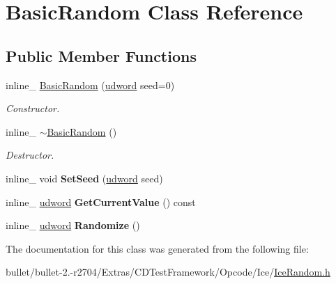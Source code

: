 \hypertarget{class_basic_random}{\section{Basic\+Random Class Reference}
\label{class_basic_random}
}
\subsection*{Public Member Functions}
\begin{DoxyCompactItemize}
\item 
\hypertarget{class_basic_random_aa0c310555289aaf7331447f9e98acd7f}{inline\+\_\+ \hyperlink{class_basic_random_aa0c310555289aaf7331447f9e98acd7f}{Basic\+Random} (\hyperlink{_ice_types_8h_a44c6f1920ba5551225fb534f9d1a1733}{udword} seed=0)}\label{class_basic_random_aa0c310555289aaf7331447f9e98acd7f}

\begin{DoxyCompactList}\small\item\em Constructor. \end{DoxyCompactList}\item 
\hypertarget{class_basic_random_a2990bcd02ae20f844d2fdf54069f8a45}{inline\+\_\+ \hyperlink{class_basic_random_a2990bcd02ae20f844d2fdf54069f8a45}{$\sim$\+Basic\+Random} ()}\label{class_basic_random_a2990bcd02ae20f844d2fdf54069f8a45}

\begin{DoxyCompactList}\small\item\em Destructor. \end{DoxyCompactList}\item 
\hypertarget{class_basic_random_ad6cc026eb6d290c918be4215e87710d7}{inline\+\_\+ void {\bfseries Set\+Seed} (\hyperlink{_ice_types_8h_a44c6f1920ba5551225fb534f9d1a1733}{udword} seed)}\label{class_basic_random_ad6cc026eb6d290c918be4215e87710d7}

\item 
\hypertarget{class_basic_random_a9092bbd85517a43a9a5351f888f97561}{inline\+\_\+ \hyperlink{_ice_types_8h_a44c6f1920ba5551225fb534f9d1a1733}{udword} {\bfseries Get\+Current\+Value} () const }\label{class_basic_random_a9092bbd85517a43a9a5351f888f97561}

\item 
\hypertarget{class_basic_random_a291834b6e62d7dceb80020cd120c8dbf}{inline\+\_\+ \hyperlink{_ice_types_8h_a44c6f1920ba5551225fb534f9d1a1733}{udword} {\bfseries Randomize} ()}\label{class_basic_random_a291834b6e62d7dceb80020cd120c8dbf}

\end{DoxyCompactItemize}


The documentation for this class was generated from the following file\+:\begin{DoxyCompactItemize}
\item 
bullet/bullet-\/2.-\/r2704/\+Extras/\+C\+D\+Test\+Framework/\+Opcode/\+Ice/\hyperlink{_ice_random_8h}{Ice\+Random.\+h}\end{DoxyCompactItemize}
